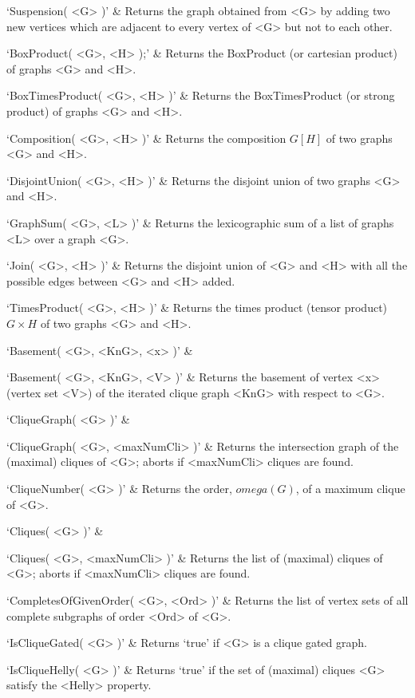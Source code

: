 `Suspension( <G> )' & 
Returns the graph obtained from  <G> by adding two new vertices which are adjacent to every
vertex of <G> but not to each other.
\enditems


\beginitems
`BoxProduct( <G>, <H> );' & 
Returns the BoxProduct (or cartesian product) of graphs <G> and <H>.

`BoxTimesProduct( <G>, <H> )' & 
Returns the BoxTimesProduct (or strong product) of graphs <G> and <H>.

`Composition( <G>, <H> )' & 
Returns the composition $G[H]$ of two graphs <G> and <H>.

`DisjointUnion( <G>, <H> )' & 
Returns the disjoint union of two graphs <G> and <H>.

`GraphSum( <G>, <L> )' & 
Returns the lexicographic sum of a list of graphs <L> over a graph <G>.

`Join( <G>, <H> )' & 
Returns the disjoint union of <G> and <H> with all the possible edges between <G> and <H> added.

`TimesProduct( <G>, <H> )' & 
Returns  the  times  product (tensor product) $G  \times  H$ of two graphs <G> and <H>.
\enditems


\beginitems
`Basement( <G>, <KnG>, <x> )' & 

`Basement( <G>, <KnG>, <V> )' & 
Returns the basement of vertex <x> (vertex set <V>) of the iterated clique graph <KnG> with respect to <G>.

`CliqueGraph( <G> )' & 

`CliqueGraph( <G>, <maxNumCli> )' & 
Returns the intersection graph of the (maximal) cliques of <G>; aborts if <maxNumCli> cliques are found.

`CliqueNumber( <G> )' & 
Returns the order, $omega(G)$, of a maximum clique of <G>.

`Cliques( <G> )' & 

`Cliques( <G>, <maxNumCli> )' & 
Returns the list of (maximal) cliques of <G>; aborts if <maxNumCli> cliques are found.

`CompletesOfGivenOrder( <G>, <Ord> )' & 
Returns the list of vertex sets of all complete subgraphs of order <Ord> of <G>.

`IsCliqueGated( <G> )' & 
Returns `true' if <G> is a clique gated graph.

`IsCliqueHelly( <G> )' & 
Returns  `true'  if  the  set of (maximal) cliques <G> satisfy the <Helly> property.

